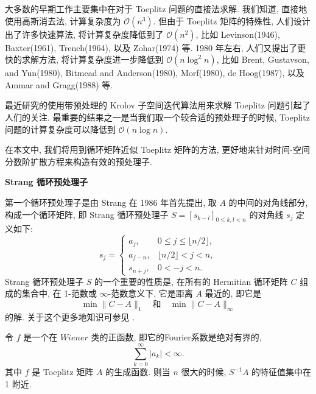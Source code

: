 \documentclass{ecnumaster}
\begin{document}

大多数的早期工作主要集中在对于 Toeplitz 问题的直接法求解.
我们知道, 直接地使用高斯消去法, 计算复杂度为 $\mathcal{O}(n^3)$.
但由于 Toeplitz 矩阵的特殊性, 人们设计出了许多快速算法,
将计算复杂度降低到了 $\mathcal{O}(n^2)$,
比如 Levinson(1946)\cite{L46},
Baxter(1961)\cite{B61}, Trench(1964)\cite{T64}, 以及 Zohar(1974)\cite{Z74} 等.
1980 年左右, 人们又提出了更快的求解方法, 将计算复杂度进一步降低到 $\mathcal{O}(n\log ^2n)$,
比如 Brent, Gustavson, and Yun(1980)\cite{BGY80}, Bitmead and Anderson(1980)\cite{BA80},
Morf(1980)\cite{M80}, de Hoog(1987)\cite{H87},
以及 Ammar and Gragg(1988)\cite{AG88} 等.

最近研究的使用带预处理的 Krolov 子空间迭代算法用来求解 Toeplitz 问题引起了人们的关注.
最重要的结果之一是当我们取一个较合适的预处理子的时候,
Toeplitz 问题的计算复杂度可以降低到 $\mathcal{O}(n\log n)$.

在本文中, 我们将用到循环矩阵近似 Toeplitz 矩阵的方法,
更好地来针对时间-空间分数阶扩散方程来构造有效的预处理子.

\medskip
\noindent\textbf{Strang 循环预处理子}

第一个循环预处理子是由 Strang\cite{S86} 在 1986 年首先提出,
取 $A$ 的中间的对角线部分, 构成一个循环矩阵,
即 Strang 循环预处理子 $S = [s_{k-l}]_{0\leq k,l < n}$ 的对角线 $s_j$ 定义如下:
\begin{equation}
  s_j =
  \begin{cases}
    a_j, & 0 \leq j \leq \lfloor n/2 \rfloor,\\
    a_{j-n}, & \lfloor n/2 \rfloor < j < n,\\
    s_{n+j}, & 0 < -j < n.
  \end{cases}
\end{equation}
Strang 循环预处理子 $S$ 的一个重要的性质是,
在所有的 Hermitian 循环矩阵 $C$ 组成的集合中,
在 1-范数或 $\infty$-范数意义下, 它是距离 $A$ 最近的, 即它是
$$
  \min\| C - A \|_1 \quad \text{和} \quad \min\| C - A \|_{\infty}
$$
的解. 关于这个更多地知识可参见 \cite{C89}.

\begin{theorem}\cite{C89,CS89}\label{the42}
令 $f$ 是一个在 $Wiener$ 类的正函数, 即它的Fourier系数是绝对有界的,
$$
  \sum_{k=0}^{\infty}|a_k| < \infty.
$$
其中 $f$ 是 Toeplitz 矩阵 $A$ 的生成函数. 则当 $n$ 很大的时候, $S^{-1}A$ 的特征值集中在 1 附近.
\end{theorem}
\end{document}
